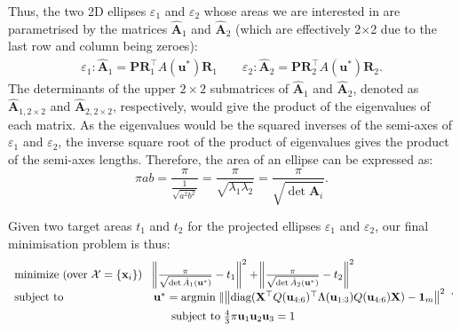 \documentclass{article}
\begin{document}
Thus, the two 2D ellipses $\varepsilon_1$ and $\varepsilon_2$ whose areas we are interested in are parametrised by the matrices $\hat{\mathbf A}_1$ and $\hat{\mathbf A}_2$ (which are effectively 2$\times$2 due to the last row and column being zeroes):
\begin{align}
    \varepsilon_1:\hat{\mathbf A}_1= \mathbf  P \mathbf{R}_1^\top A(\mathbf u^*) \mathbf{R}_1 \qquad \varepsilon_2: \hat{\mathbf A}_2 =\mathbf P \mathbf{R}_2^\top A(\mathbf u^*) \mathbf{R}_2.
\end{align}
The determinants of the upper $2\times 2$ submatrices of $\hat{\mathbf A}_1$ and $\hat{\mathbf A}_2$, denoted as $\hat{\mathbf A}_{1, 2\times2}$ and $\hat{\mathbf A}_{2, 2\times2}$, respectively, would give the product of the eigenvalues of each matrix. As the eigenvalues would be the squared inverses of the semi-axes of $\varepsilon_1$ and $\varepsilon_2$, the inverse square root of the product of eigenvalues gives the product of the semi-axes lengths. Therefore, the area of an ellipse can be expressed as:
\begin{equation}
    \pi ab = \frac{\pi }{\frac{1}{\sqrt{a^2b^2}}}= \frac{\pi }{\sqrt{\lambda _1 \lambda _2}} = \frac{\pi}{\sqrt{\det{\hat{\mathbf A}_i}}}.
\end{equation}

Given two target areas $t_1$ and $t_2$ for the projected ellipses $\varepsilon_1$ and $\varepsilon_2$, our final minimisation problem is thus:
$$
\begin{array}{ll}
  \text{minimize (over $\mathcal X = \{ \mathbf x_i \}$)} &  \!\left\Vert  \frac{\pi}{\sqrt{\det \hat{A}_1(\mathbf u^*)}} - t_1 \right\Vert ^2 + \!\left\Vert  \frac{\pi}{\sqrt{\det \hat{A}_2(\mathbf u^*)}} - t_2 \right\Vert ^2  \\[0.5em]
  \text{subject to} & \mathbf u^* = \text{argmin} \; \|\!\left\Vert \text{diag}(\mathbf X^\top Q(\mathbf u_{4:6}) ^\top \Lambda(\mathbf u_{1:3}) Q(\mathbf u_{4:6}) \mathbf X) - \mathbf 1_m \right\Vert ^2 \\[0.5em]
  & \hphantom{y =} \text{subject to} \;  \frac{4}{3} \pi \mathbf u_1 \mathbf u_2 \mathbf u_3 = 1
\end{array}.
$$
\end{document}
